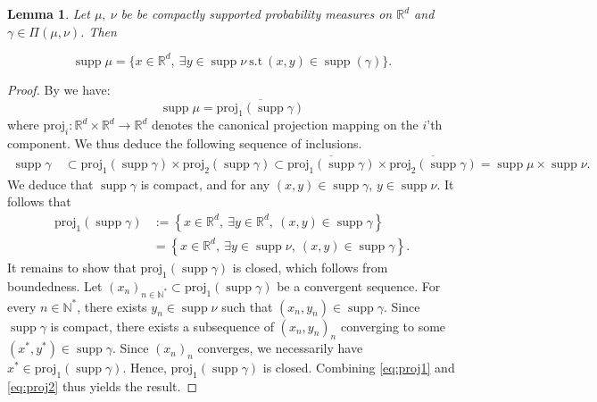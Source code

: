 \documentclass[11pt]{article}
\newtheorem{lemma}{Lemma}[section]
\DeclareMathOperator{\supp}{supp}
\newcommand{\R}{\mathbb R}
\newcommand{\1}{\mathbbm{1}}
\numberwithin{equation}{section}
\begin{document}
\begin{lemma}
    Let $\mu,\:\nu$ be be compactly supported probability measures on $\R^d$ and $\gamma\in \Pi(\mu,\nu)$. Then 
    
    \begin{equation*}
        \supp \mu=\{x\in \R^d,\:\exists y\in \supp \nu\:\text{s.t}\:(x,y)\in\supp(\gamma)\}.
    \end{equation*}
    \label{lem:projection_support_coupling}
\end{lemma}
\begin{proof}
    By \cite[Lemma 3]{mccann2010optimal} we have:
    \begin{equation}\label{eq:proj1}
        \supp \mu=\overline{\mathrm{proj}_1(\supp \gamma)}
    \end{equation}
    where $\mathrm{proj}_i:\R^d\times \R^d\longrightarrow\R^d$ denotes the canonical projection mapping on the $i$'th component. We thus deduce the following sequence of inclusions. 
    \begin{align*}
        \supp \gamma \ &\subset \mathrm{proj}_1(\supp \gamma) \times \mathrm{proj}_2(\supp \gamma)\subset \overline{\mathrm{proj}_1(\supp \gamma)} \times \overline{\mathrm{proj}_2(\supp \gamma)} =\supp \mu \times \supp \nu.
    \end{align*}
    We deduce that $\supp \gamma$ is compact, and for any $(x,y)\in \supp \gamma$, $y\in \supp \nu$. It follows that
    \begin{equation}\label{eq:proj2}
        \begin{split}
            \mathrm{proj}_1(\supp \gamma)&:=\left\{x\in \R^d,\:\exists y\in \R^d,\:(x,y)\in \supp \gamma \right\}\\
            &=\left\{x\in \R^d,\:\exists y\in \supp \nu,\:(x,y)\in \supp \gamma \right\}. 
        \end{split}
    \end{equation}
    It remains to show that $\mathrm{proj}_1(\supp \gamma)$ is closed, which follows from boundedness. Let $(x_n)_{n\in \mathbb{N}^*}\subset \mathrm{proj}_1(\supp \gamma)$ be a convergent sequence. For every $n\in \mathbb{N}^*$, there exists $y_n\in \supp \nu$ such that $(x_n,y_n)\in \supp \gamma$. Since $\supp \gamma$ is compact, there exists a subsequence of $(x_n,y_n)_n$ converging to some $(x^*,y^*)\in \supp \gamma$. Since $(x_n)_n$ converges, we necessarily have $x^*\in \mathrm{proj}_1(\supp \gamma)$. Hence, $\mathrm{proj}_1(\supp \gamma)$ is closed. Combining \eqref{eq:proj1} and \eqref{eq:proj2} thus yields the result.
\end{proof}
\end{document}
